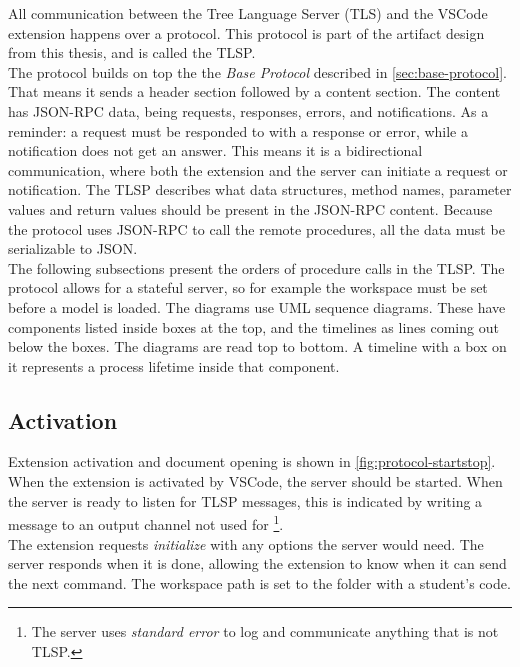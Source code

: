 \newcommand{\bluearrowDesc}{The blue half-arrow ($\rightharpoondown$) is part of the \acrfull{TLSP}.}

All communication between the Tree Language Server (TLS) and the \gls{VSCode} extension happens over a protocol.
This protocol is part of the artifact design from this thesis, and is called the \acrlong{TLSP}.\\

The protocol builds on top the the \textit{Base Protocol} described in \cref{sec:base-protocol}.
That means it sends a header section followed by a content section.
The content has \gls{JSON-RPC} data, being requests, responses, errors, and notifications.
As a reminder: a request must be responded to with a response or error, while a notification does not get an answer.
This means it is a bidirectional communication, where both the extension and the server can initiate a request or notification.
The \acrshort{TLSP} describes what data structures, method names, parameter values and return values should be present in the \gls{JSON-RPC} content.
Because the protocol uses \gls{JSON-RPC} to call the remote procedures, all the data must be serializable to \gls{JSON}.\\

The following subsections present the orders of procedure calls in the \acrshort{TLSP}.
The protocol allows for a stateful server, so for example the workspace must be set before a model is loaded.
The diagrams use UML sequence diagrams.
These have components listed inside boxes at the top, and the timelines as lines coming out below the boxes.
The diagrams are read top to bottom.
A timeline with a box on it represents a process lifetime inside that component.

\subsection{Activation}

Extension activation and document opening is shown in \cref{fig:protocol-startstop}.
When the extension is activated by \gls{VSCode}, the server should be started.
When the server is ready to listen for \acrshort{TLSP} messages, this is indicated by writing a message to an output channel not used for \footnote{The server uses \textit{standard error} to log and communicate anything that is not \acrshort{TLSP}.}.\\

The extension requests \textit{initialize} with any options the server would need.
The server responds when it is done, allowing the extension to know when it can send the next command.
The workspace path is set to the folder with a student's code.\\

